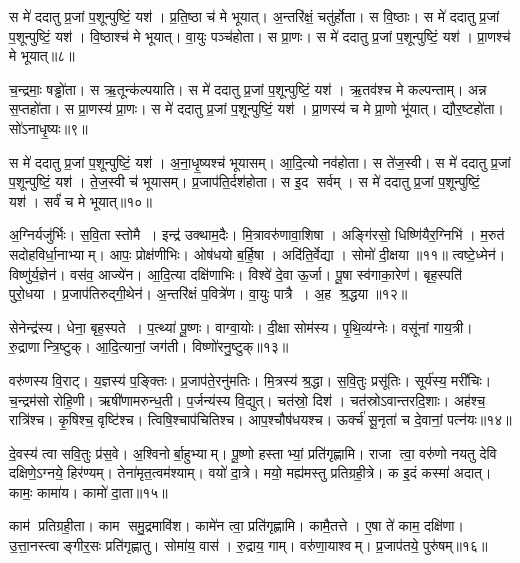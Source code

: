 स मे॑ ददातु प्र॒जां प॒शून्पुष्टिं॒ यश॑। प्र॒ति॒ष्ठा च॑ मे भूयात्। अ॒न्तरि॑क्षं॒ चतु॑र्\mbox{}होता। स वि॒ष्ठाः। स मे॑ ददातु प्र॒जां प॒शून्पुष्टिं॒ यश॑। वि॒ष्ठाश्च॑ मे भूयात्। वा॒युः पञ्च॑होता। स प्रा॒णः। स मे॑ ददातु प्र॒जां प॒शून्पुष्टिं॒ यश॑। प्रा॒णश्च॑ मे भूयात्॥८॥

च॒न्द्रमाः॒ षड्ढो॑ता। स ऋ॒तून्क॑ल्पयाति। स मे॑ ददातु प्र॒जां प॒शून्पुष्टिं॒ यश॑। ऋ॒तव॑श्च मे कल्पन्ताम्। अन्न स॒प्तहो॑ता। स प्रा॒णस्य॑ प्रा॒णः। स मे॑ ददातु प्र॒जां प॒शून्पुष्टिं॒ यश॑। प्रा॒णस्य॑ च मे प्रा॒णो भू॑यात्। द्यौर॒ष्टहो॑ता। सो॑ऽनाधृ॒ष्यः॥९॥

स मे॑ ददातु प्र॒जां प॒शून्पुष्टिं॒ यश॑। अ॒ना॒धृ॒ष्यश्च॑ भूयासम्। आ॒दि॒त्यो नव॑होता। स ते॑ज॒स्वी। स मे॑ ददातु प्र॒जां प॒शून्पुष्टिं॒ यश॑। ते॒ज॒स्वी च॑ भूयासम्। प्र॒जाप॑ति॒र्दश॑होता। स इ॒द सर्वम्। स मे॑ ददातु प्र॒जां प॒शून्पुष्टिं॒ यश॑। सर्वं॑ च मे भूयात्॥१०॥
\anuvakamend[प्र॒ति॒ष्ठा प्रा॒णश्च॑ मे भूयादनाधृ॒ष्यः सर्वं॑ च मे भूयात्]

अ॒ग्निर्यजु॑र्भिः। स॒वि॒ता स्तोमै। इन्द्र॑ उक्थाम॒दैः। मि॒त्रावरु॑णा\-वा॒शिषा। अङ्गि॑रसो॒ धिष्णि॑यैर॒ग्निभि॑। म॒रुत॑ सदोहविर्धा॒नाभ्याम्। आपः॒ प्रोक्ष॑णीभिः। ओष॑धयो ब॒र्\mbox{}हि॒षा। अदि॑ति॒र्वेद्या। सोमो॑ दी॒क्षया॥११॥
त्वष्टे॒ध्मेन॑। विष्णु॑र्\mbox{}य॒ज्ञेन॑। वस॑व॒ आज्ये॑न। आ॒दि॒त्या दक्षि॑णाभिः। विश्वे॑ दे॒वा ऊ॒र्जा। पू॒षा स्व॑गाका॒रेण॑। बृह॒स्पति॑ पुरो॒धया। प्र॒जाप॑तिरुद्गी॒थेन॑। अ॒न्तरि॑क्षं प॒वित्रे॑ण। वा॒युः पात्रै। अ॒ह श्र॒द्धया॥१२॥
\anuvakamend[दी॒क्षया॒ पात्रै॒रेकं॑ च]

सेनेन्द्र॑स्य। धेना॒ बृह॒स्पते। प॒त्थ्या॑ पू॒ष्णः। वाग्वा॒योः। दी॒क्षा सोम॑स्य। पृ॒थि॒व्य॑ग्नेः। वसू॑नां  गाय॒त्री। रु॒द्राणान्त्रि॒ष्टुक्। आ॒दि॒त्यानां॒ जग॑ती। विष्णो॑रनु॒ष्टुक्॥१३॥%

वरु॑णस्य वि॒राट्। य॒ज्ञस्य॑ प॒ङ्क्तिः। प्र॒जाप॑ते॒रनु॑मतिः। मि॒त्रस्य॑ श्र॒द्धा। स॒वि॒तुः प्रसू॑तिः। सूर्य॑स्य॒ मरी॑चिः। च॒न्द्रम॑सो रोहि॒णी। ऋषी॑णामरुन्ध॒ती। प॒र्जन्य॑स्य वि॒द्युत्। चत॑स्रो॒ दिश॑। चत॑स्रोऽवान्तरदि॒शाः। अह॑श्च॒ रात्रि॑श्च। कृ॒षिश्च॒ वृष्टि॑श्च। त्विषि॒श्चाप॑चितिश्च। आप॒श्चौष॑धयश्च। ऊर्क्च॑ सू॒नृता॑ च दे॒वानां॒ पत्न॑यः॥१४॥%
\anuvakamend[अ॒नु॒ष्टुग्दिशः॒ षट्च॑]

दे॒वस्य॑ त्वा सवि॒तुः प्र॑स॒वे। अ॒श्विनोर्बा॒हुभ्याम्। पू॒ष्णो हस्ताभ्यां॒ प्रति॑गृह्णामि। राजा त्वा॒ वरु॑णो नयतु देवि दक्षिणे॒ऽग्नये॒ हिर॑ण्यम्। तेना॑मृत॒त्वम॑श्याम्। वयो॑ दा॒त्रे। मयो॒ मह्य॑मस्तु प्रतिग्रही॒त्रे। क इ॒दं कस्मा॑ अदात्। कामः॒ कामा॑य। कामो॑ दा॒ता॥१५॥

काम॑ प्रतिग्रही॒ता। काम समु॒द्रमावि॑श। कामे॑न त्वा॒ प्रति॑गृह्णामि। कामै॒तत्ते। ए॒षा ते॑ काम॒ दक्षि॑णा। उ॒त्ता॒नस्त्वाङ्गीर॒सः प्रति॑गृह्णातु। सोमा॑य॒ वास॑। रु॒द्राय॒ गाम्। वरु॑णा॒याश्वम्। प्र॒जाप॑तये॒ पुरु॑षम्॥१६॥%

